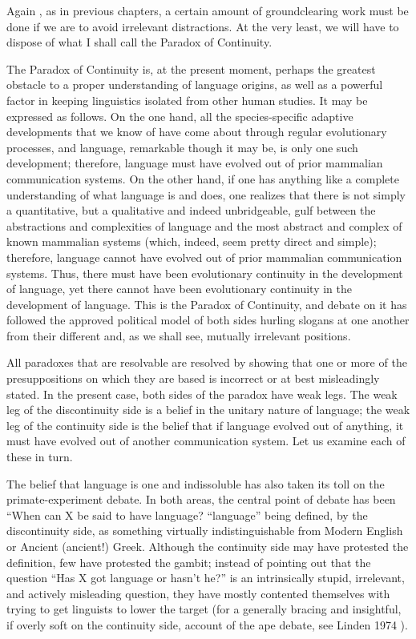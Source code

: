 Again , as in previous chapters, a certain amount of ground\-clearing work must be done if we are to avoid irrelevant distractions. At the very least, we will have to dispose of what I shall call the Para\-dox of Continuity.

The Paradox of Continuity is, at the present moment, perhaps the greatest obstacle to a proper understanding of language origins, as well as a powerful factor in keeping linguistics isolated from other human studies. It may be expressed as follows. On the one hand, all the species-specific adaptive developments that we know of have come about through regular evolutionary processes, and language, remarkable though it may be, is only one such development; therefore, language must have evolved out of prior mammalian communication systems. On the other hand, if one has anything like a complete understanding of what language is and does, one realizes that there is not simply a quantitative, but a qualitative and indeed unbridgeable, gulf between
the abstractions and complexities of language and the most abstract and complex of known mammalian systems (which, indeed, seem pretty direct and simple); therefore, language cannot have evolved out of prior mammalian communication systems. Thus, there must have been evolutionary continuity in the development of language, yet there cannot have been evolutionary continuity in the development of language. This is the Paradox of Continuity, and debate on it has followed the approved political model of both sides hurling slogans at one another from their different and, as we shall see, mutually irrele\-vant positions.

All paradoxes that are resolvable are resolved by showing that one or more of the presuppositions on which they are based is incorrect or at best misleadingly stated. In the present case, both sides of the paradox have weak legs. The weak leg of the discontinuity side is a belief in the unitary nature of language; the weak leg of the continuity side is the belief that if language evolved out of anything, it must have evolved out of another communication system. Let us examine each of these in turn.

The belief that language is one and indissoluble has also taken its toll on the primate-experiment debate. In both areas, the central point of debate has been ``When can X be said to have language?{\textquotedbl}\- ``language'' being defined, by the discontinuity side, as something virtually indistinguishable from Modern English or Ancient (ancient!) Greek. Although the continuity side may have protested the definition, few have protested the gambit; instead of pointing out that the ques\-tion ``Has X got language or hasn't he?'' is an intrinsically stupid, irrelevant, and actively misleading question, they have mostly con\-tented themselves with trying to get linguists to lower the target (for a generally bracing and insightful, if overly soft on the continuity side, account of the ape debate, see Linden 1974 ).

